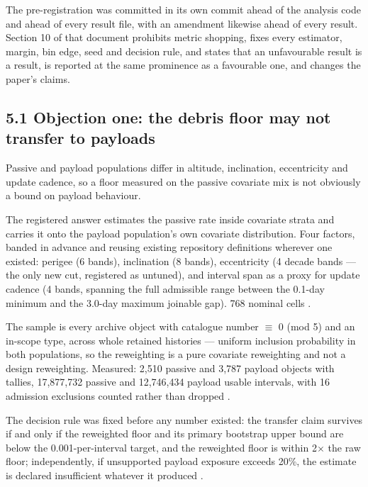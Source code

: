 \documentclass[11pt]{article}
\begin{document}
The pre-registration
was committed in its own commit ahead of the analysis code and ahead of every result file, with an amendment
likewise ahead of every result. Section 10 of that document prohibits metric shopping, fixes every estimator, margin, bin edge, seed and decision rule, and states that an unfavourable result is a result, is reported at the same prominence as a favourable one, and changes the paper's claims.

\subsection*{5.1 Objection one: the debris floor may not transfer to payloads}

Passive and payload populations differ in altitude, inclination, eccentricity and update cadence, so a floor measured on the passive covariate mix is not obviously a bound on payload behaviour.

The registered answer estimates the passive rate inside covariate strata and carries it onto the payload population's own covariate distribution. Four factors, banded in advance and reusing existing repository definitions wherever one existed: perigee (6 bands), inclination (8 bands), eccentricity (4 decade bands --- the only new cut, registered as untuned), and interval span as a proxy for update cadence (4 bands, spanning the full admissible range between the 0.1-day minimum and the 3.0-day maximum joinable gap). 768 nominal cells%
.

The sample is every archive object with catalogue number $\equiv$ 0 (mod 5) and an in-scope type, across whole retained histories --- uniform inclusion probability in both populations, so the reweighting is a pure covariate reweighting and not a design reweighting. Measured: 2,510 passive and 3,787 payload objects with tallies, 17,877,732 passive and 12,746,434 payload usable intervals, with 16 admission exclusions counted rather than dropped%
.

The decision rule was fixed before any number existed: the transfer claim survives if and only if the reweighted floor and its primary bootstrap upper bound are below the 0.001-per-interval target, and the reweighted floor is within 2$\times$ the raw floor; independently, if unsupported payload exposure exceeds 20\%, the estimate is declared insufficient whatever it produced%
.
\end{document}
